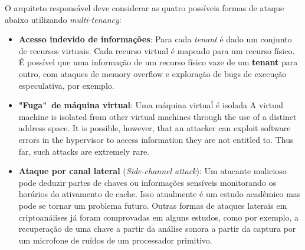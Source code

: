 O arquiteto responsável deve considerar as quatro possíveis formas de ataque abaixo utilizando \textit{multi-tenancy}:
\begin{itemize}
	\item
	\textbf{Acesso indevido de informações}: 
	Para cada \textit{tenant} é dado um conjunto de recursos virtuais. Cada recurso virtual é mapeado para um recurso físico. É possível que uma informação de um recurso físico vaze de um \textbf{tenant} para outro, com ataques de memory overflow e exploração de bugs de execução especulativa, por exemplo.

	\item
	\textbf{"Fuga"~de máquina virtual}: 
	Uma máquina virtuaĺ é isolada 
	A virtual machine is isolated from other virtual machines through the use of a distinct address space. It is possible, however, that an attacker can exploit software errors in the hypervisor to access information they are not entitled to. Thus far, such attacks are extremely rare.

	\item
	\textbf{Ataque por canal lateral } (\textit{Side-channel attack}): 
	Um atacante malicioso pode deduzir partes de chaves ou informações sensíveis monitorando os horários do ativamento de cache. Isso atualmente é um estudo acadêmico mas pode se tornar um problema futuro. Outras formas de ataques laterais em criptoanálises já foram comprovadas em alguns estudos, como por exemplo, a recuperação de uma chave a partir da análise sonora a partir da captura por um microfone de ruídos de um processador primitivo. 
\iffalse
	\item
	\textbf{Ataque de negação de serviço}:
	Other tenants may use sufficient resources on the host computer so that your application is not able to provide service. Some providers allow customers to reserve entire machines for their exclusive use. Although this defeats some of the economic benefits of using the cloud, it is a mechanism to prevent multi-tenancy attacks. An organization should consider possible attacks when deciding which applications to host in the cloud, just as they should when considering any hosting option. 
\fi
\end{itemize}
